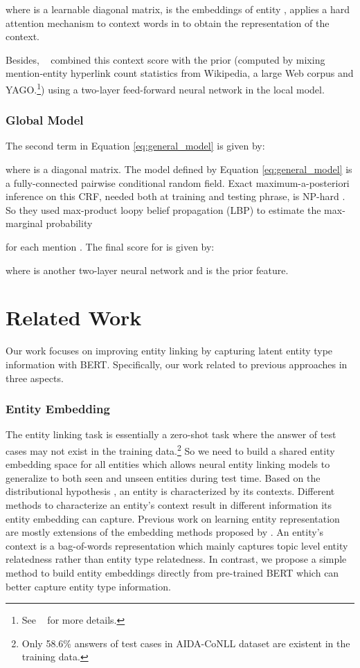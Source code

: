 \documentclass[letterpaper]{article} \usepackage{aaai20}  \usepackage{times}  \usepackage{helvet} \usepackage{courier}  \usepackage[hyphens]{url}  \usepackage{graphicx} \urlstyle{rm} \def\UrlFont{\rm}  \usepackage{graphicx}  \frenchspacing  \setlength{\pdfpagewidth}{8.5in}  \setlength{\pdfpageheight}{11in}  \usepackage{multirow}
\newcommand{\namecite}[1]{\citeauthor{#1}~\shortcite{#1}}
\begin{document}
where  is a learnable diagonal matrix,  is the embeddings of entity ,  applies a hard attention mechanism to context words in  to obtain the representation of the context.

Besides, \namecite{ganea2017deep} combined this context score with the prior  (computed by mixing mention-entity hyperlink count statistics from Wikipedia, a large Web corpus and YAGO.\footnote{See \namecite{ganea2017deep} for more details.}) using a two-layer feed-forward neural network in the local model. 

\subsubsection{Global Model}
The second term in Equation \ref{eq:general_model} is given by:

where  is a diagonal matrix. The model defined by Equation \ref{eq:general_model} is a fully-connected pairwise conditional random field. Exact maximum-a-posteriori inference on this CRF, needed both at training and testing phrase, is NP-hard \cite{wainwright2008graphical}. So they used max-product loopy belief propagation (LBP) to estimate the max-marginal probability 

for each mention . 
The final score for  is given by: 

where  is another two-layer neural network and  is the prior feature.


\section{Related Work}
    Our work focuses on improving entity linking by capturing latent entity type information with BERT. Specifically, our work related to previous approaches in three aspects.
    \subsubsection{Entity Embedding}
    The entity linking task is essentially a zero-shot task where the answer of test cases may not exist in the training data.\footnote{Only 58.6\% answers of test cases in AIDA-CoNLL dataset are existent in the training data.} So we need to build a shared entity embedding space for all entities which allows neural entity linking models to generalize to both seen and unseen entities during test time. 
    Based on the distributional hypothesis \cite{harris1954distributional}, an entity is characterized by its contexts. Different methods to characterize an entity's context result in different information its entity embedding can capture. Previous work \cite{yamada2016joint,ganea2017deep} on learning entity representation are mostly extensions of the embedding methods proposed by \cite{mikolov2013distributed}. An entity's context is a bag-of-words representation which mainly captures topic level entity relatedness rather than entity type relatedness. 
    In contrast, we propose a simple method to build entity embeddings directly from pre-trained BERT \cite{devlin-etal-2019-bert} which can better capture entity type information. 
\end{document}
